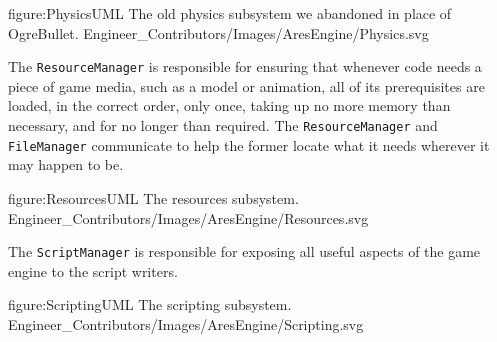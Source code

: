 \FullPageDiagram
    {figure:PhysicsUML}
    {The old physics subsystem we abandoned in place of OgreBullet.}
    {Engineer_Contributors/Images/AresEngine/Physics.svg}

\page 
{}
The {\tt ResourceManager} is responsible for ensuring that whenever code needs a piece of game media, such as a model or animation, all of its prerequisites are loaded, in the correct order, only once, taking up no more memory than necessary, and for no longer than required. The {\tt ResourceManager} and {\tt FileManager} communicate to help the former locate what it needs wherever it may happen to be.

\FullPageDiagram
    {figure:ResourcesUML}
    {The resources subsystem.}
    {Engineer_Contributors/Images/AresEngine/Resources.svg}

\page 
{}
The {\tt ScriptManager} is responsible for exposing all useful aspects of the game engine to the script writers.

\FullPageDiagram
    {figure:ScriptingUML}
    {The scripting subsystem.}
    {Engineer_Contributors/Images/AresEngine/Scripting.svg}

